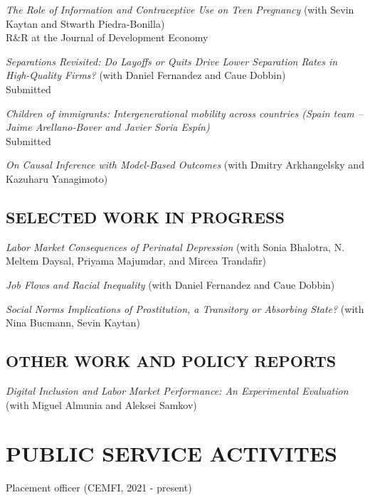 \documentclass[margin]{res} %
\newcommand{\rootFolder}{/Users/tomzohar/Dropbox/}
\begin{document}
\begin{resume}
%

\textit{The Role of Information and Contraceptive Use on Teen Pregnancy} (with Sevin Kaytan and Stwarth Piedra-Bonilla) \\
R\&R at the Journal of Development Economy

\textit{Separations Revisited: Do Layoffs or Quits Drive Lower Separation Rates in High-Quality Firms?} (with Daniel Fernandez and Caue Dobbin) \\
Submitted

\textit{Children of immigrants: Intergenerational mobility across countries (Spain team -- Jaime Arellano-Bover and Javier Soria Espín)}\\
Submitted

\textit{On Causal Inference with Model-Based Outcomes} (with Dmitry Arkhangelsky and Kazuharu Yanagimoto)

\subsection{SELECTED WORK IN PROGRESS}

\textit{Labor Market Consequences of Perinatal Depression} (with Sonia Bhalotra, N. Meltem Daysal, Priyama Majumdar, and Mircea Trandafir) 

\textit{Job Flows and Racial Inequality} (with Daniel Fernandez and Caue Dobbin) 

\textit{Social Norms Implications of Prostitution, a Transitory or Absorbing State?} (with Nina Bucmann, Sevin Kaytan)

\subsection{OTHER WORK AND POLICY REPORTS}

\textit{Digital Inclusion and Labor Market Performance: An Experimental Evaluation} (with Miguel Almunia and Aleksei Samkov)

\section{PUBLIC SERVICE ACTIVITES} 

Placement officer (CEMFI, 2021 - present)


\end{resume}
\end{document}
